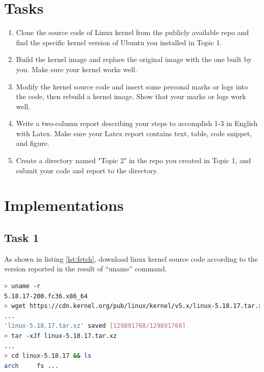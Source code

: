 \documentclass[12pt, a4paper, twocolumn]{article}
\begin{document}

\twocolumn[
  \begin{@twocolumnfalse}
    \maketitle
  \end{@twocolumnfalse}
]


\section{Tasks}

\begin{enumerate}
    \item Clone the source code of Linux kernel from the publicly available repo and find the specific kernel version of Ubuntu you installed in Topic 1.
    \item Build the kernel image and replace the original image with the one built by you. Make sure your kernel works well.
    \item Modify the kernel source code and insert some personal marks or logs into the code, then rebuild a kernel image. Show that your marks or logs work well.
    \item Write a two-column report describing your steps to accomplish 1-3 in English with Latex. Make sure your Latex report contains text, table, code snippet, and figure.
    \item Create a directory named "Topic 2" in the repo you created in Topic 1, and submit your code and report to the directory.
\end{enumerate}

\section{Implementations}

\subsection{Task 1}

As shown in listing \ref{lst:fetch}, download linux kernel source code according to the version reported in the result of ``uname'' command.

\begin{lstlisting}[language=bash, caption=Fetch Sources, frame=tlrb, label=lst:fetch]
> uname -r
5.18.17-200.fc36.x86_64
> wget https://cdn.kernel.org/pub/linux/kernel/v5.x/linux-5.18.17.tar.xz
...
'linux-5.18.17.tar.xz' saved [129891768/129891768]
> tar -xJf linux-5.18.17.tar.xz
...
> cd linux-5.18.17 && ls
arch     fs ...
\end{lstlisting}
\end{document}
